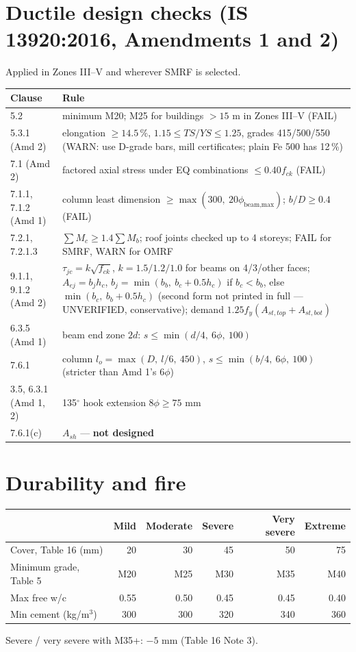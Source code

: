 \documentclass[10pt,a4paper]{article}
\newcommand{\fck}{f_{ck}}
\begin{document}
\section{Ductile design checks (IS 13920:2016, Amendments 1 and 2)}
Applied in Zones III--V and wherever SMRF is selected.
\begin{longtable}{L{38mm}L{126mm}}
\toprule \textbf{Clause} & \textbf{Rule} \\ \midrule {} & minimum M20; M25 for buildings $>15$ m in Zones III--V (FAIL) \\
5.3.1 (Amd 2) & elongation $\ge14.5\,\%$, $1.15\le TS/YS\le1.25$, grades 415/500/550 (WARN: use D-grade bars, mill
certificates; plain Fe 500 has 12\,\%) \\
7.1 (Amd 2) & factored axial stress under EQ combinations $\le0.40\fck$ (FAIL) \\
7.1.1, 7.1.2 (Amd 1) & column least dimension $\ge\max(300,\ 20\phi_\text{beam,max})$; $b/D\ge0.4$ (FAIL) \\
7.2.1, 7.2.1.3 & $\sum M_c\ge1.4\sum M_b$; roof joints checked up to 4 storeys; FAIL for SMRF, WARN for OMRF \\
9.1.1, 9.1.2 (Amd 2) & $\tau_{jc}=k\sqrt{\fck}$, $k=1.5/1.2/1.0$ for beams on 4/3/other faces;
$A_{ej}=b_jh_c$, $b_j=\min(b_b,\ b_c+0.5h_c)$ if $b_c<b_b$, else $\min(b_c,\ b_b+0.5h_c)$ (second form not printed in
full --- UNVERIFIED, conservative); demand $1.25f_y(A_{st,top}+A_{st,bot})$ \\
6.3.5 (Amd 1) & beam end zone $2d$: $s\le\min(d/4,\ 6\phi,\ 100)$ \\
7.6.1 & column $l_o=\max(D,\ l/6,\ 450)$, $s\le\min(b/4,\ 6\phi,\ 100)$ (stricter than Amd 1's $6\phi$) \\
3.5, 6.3.1 (Amd 1, 2) & 135$^\circ$ hook extension $8\phi\ge75$ mm \\
7.6.1(c) & $A_{sh}$ --- \textbf{not designed} \\
\bottomrule
\end{longtable}

\section{Durability and fire}
\begin{longtable}{L{30mm}rrrrr}
\toprule & Mild & Moderate & Severe & Very severe & Extreme \\ \midrule \endhead
Cover, Table 16 (mm) & 20 & 30 & 45 & 50 & 75 \\
Minimum grade, Table 5 & M20 & M25 & M30 & M35 & M40 \\
Max free w/c & 0.55 & 0.50 & 0.45 & 0.45 & 0.40 \\
Min cement (kg/m$^3$) & 300 & 300 & 320 & 340 & 360 \\ \bottomrule
\end{longtable}
Severe / very severe with M35+: $-5$ mm (Table 16 Note 3).
\end{document}
